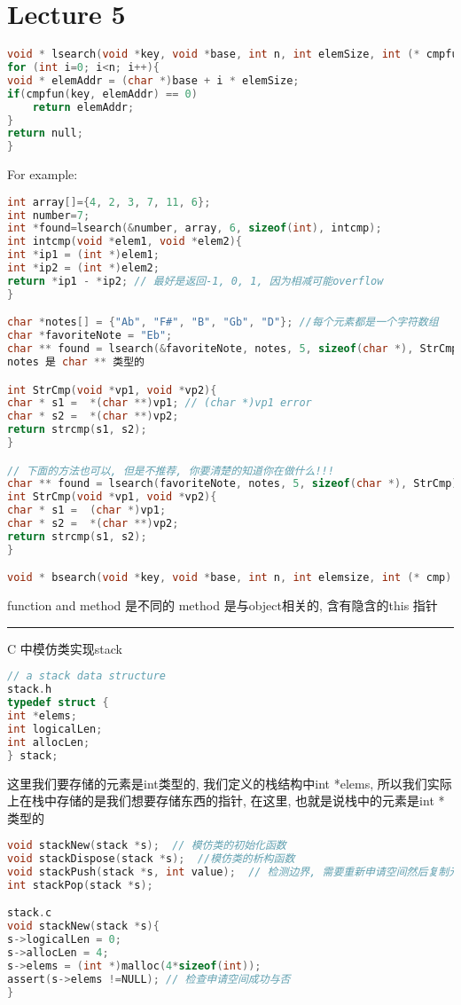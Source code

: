 \documentclass{article}
\begin{document}
\section{Lecture 5}
\begin{lstlisting}[language = C]
void * lsearch(void *key, void *base, int n, int elemSize, int (* cmpfun)(void *, void *)){
for (int i=0; i<n; i++){
void * elemAddr = (char *)base + i * elemSize;	
if(cmpfun(key, elemAddr) == 0)
	return elemAddr;
}
return null;
}
\end{lstlisting}
For example:
\begin{lstlisting}[language = C]
int array[]={4, 2, 3, 7, 11, 6};
int number=7;
int *found=lsearch(&number, array, 6, sizeof(int), intcmp);
int intcmp(void *elem1, void *elem2){
int *ip1 = (int *)elem1;
int *ip2 = (int *)elem2;
return *ip1 - *ip2; // 最好是返回-1, 0, 1, 因为相减可能overflow
}

char *notes[] = {"Ab", "F#", "B", "Gb", "D"}; //每个元素都是一个字符数组
char *favoriteNote = "Eb";
char ** found = lsearch(&favoriteNote, notes, 5, sizeof(char *), StrCmp);
notes 是 char ** 类型的

int StrCmp(void *vp1, void *vp2){
char * s1 =  *(char **)vp1; // (char *)vp1 error
char * s2 =  *(char **)vp2;
return strcmp(s1, s2);
}

// 下面的方法也可以, 但是不推荐, 你要清楚的知道你在做什么!!!
char ** found = lsearch(favoriteNote, notes, 5, sizeof(char *), StrCmp);
int StrCmp(void *vp1, void *vp2){
char * s1 =  (char *)vp1;
char * s2 =  *(char **)vp2;
return strcmp(s1, s2);
}

void * bsearch(void *key, void *base, int n, int elemsize, int (* cmp)(void *, void *))
\end{lstlisting}

function and method 是不同的
method 是与object相关的, 含有隐含的this 指针

\bigskip\rule{6.8cm}{0.2em}
C 中模仿类实现stack
\begin{lstlisting}[language = C]
// a stack data structure
stack.h
typedef struct {
int *elems;
int logicalLen;
int allocLen;
} stack;
\end{lstlisting}
这里我们要存储的元素是int类型的, 我们定义的栈结构中int *elems, 所以我们实际上在栈中存储的是我们想要存储东西的指针, 在这里, 也就是说栈中的元素是int *类型的

\begin{lstlisting}[language = C]
void stackNew(stack *s);  // 模仿类的初始化函数
void stackDispose(stack *s);  //模仿类的析构函数
void stackPush(stack *s, int value);  // 检测边界, 需要重新申请空间然后复制元素后再添加
int stackPop(stack *s);

stack.c
void stackNew(stack *s){
s->logicalLen = 0;
s->allocLen = 4;
s->elems = (int *)malloc(4*sizeof(int));
assert(s->elems !=NULL); // 检查申请空间成功与否
}
\end{lstlisting}
\end{document}
